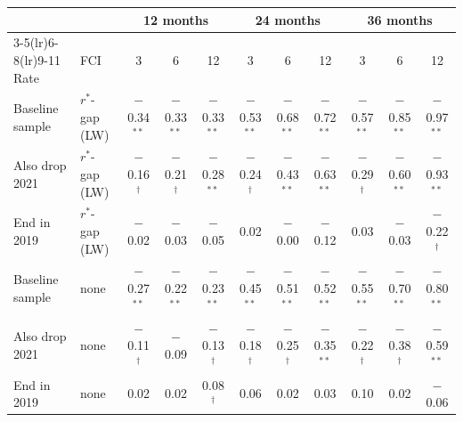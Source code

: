 \begin{tabular}{llccccccccc}
\toprule
 & & \multicolumn{3}{c}{12 months} & \multicolumn{3}{c}{24 months} & \multicolumn{3}{c}{36 months}\\
\cmidrule(lr){3-5}\cmidrule(lr){6-8}\cmidrule(lr){9-11}
Rate & FCI & 3 & 6 & 12 & 3 & 6 & 12 & 3 & 6 & 12 \\
\midrule
Baseline sample & $r^*$-gap (LW) & $-$0.34$^{**}$ & $-$0.33$^{**}$ & $-$0.33$^{**}$ & $-$0.53$^{**}$ & $-$0.68$^{**}$ & $-$0.72$^{**}$ & $-$0.57$^{**}$ & $-$0.85$^{**}$ & $-$0.97$^{**}$ \\
Also drop 2021 & $r^*$-gap (LW) & $-$0.16$^{\dagger}$ & $-$0.21$^{\dagger}$ & $-$0.28$^{**}$ & $-$0.24$^{\dagger}$ & $-$0.43$^{**}$ & $-$0.63$^{**}$ & $-$0.29$^{\dagger}$ & $-$0.60$^{**}$ & $-$0.93$^{**}$ \\
End in 2019 & $r^*$-gap (LW) & $-$0.02 & $-$0.03 & $-$0.05 & 0.02 & $-$0.00 & $-$0.12 & 0.03 & $-$0.03 & $-$0.22$^{\dagger}$ \\
\midrule
Baseline sample & none & $-$0.27$^{**}$ & $-$0.22$^{**}$ & $-$0.23$^{**}$ & $-$0.45$^{**}$ & $-$0.51$^{**}$ & $-$0.52$^{**}$ & $-$0.55$^{**}$ & $-$0.70$^{**}$ & $-$0.80$^{**}$ \\
Also drop 2021 & none & $-$0.11$^{\dagger}$ & $-$0.09 & $-$0.13$^{\dagger}$ & $-$0.18$^{\dagger}$ & $-$0.25$^{\dagger}$ & $-$0.35$^{**}$ & $-$0.22$^{\dagger}$ & $-$0.38$^{\dagger}$ & $-$0.59$^{**}$ \\
End in 2019 & none & 0.02 & 0.02 & 0.08$^{\dagger}$ & 0.06 & 0.02 & 0.03 & 0.10 & 0.02 & $-$0.06 \\
\bottomrule
\end{tabular}
